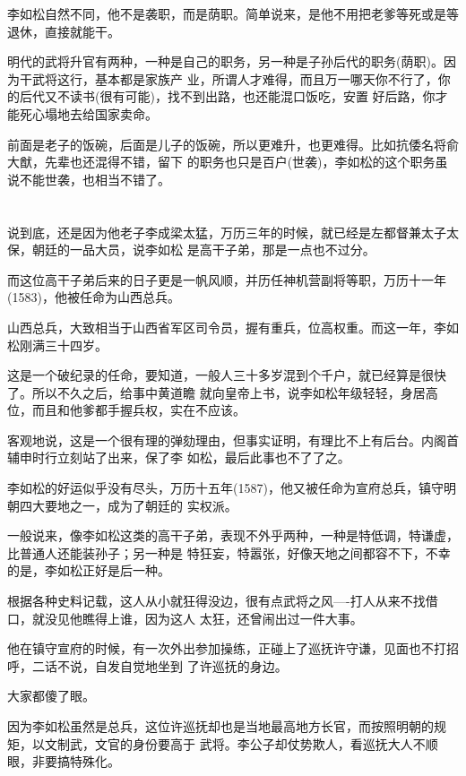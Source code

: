 \documentclass[11pt,a4paper,onecolumn]{article}
\begin{document}
李如松自然不同，他不是袭职，而是荫职。简单说来，是他不用把老爹等死或是等退休，直接就能干。

明代的武将升官有两种，一种是自己的职务，另一种是子孙后代的职务(荫职)。因为干武将这行，基本都是家族产
业，所谓人才难得，而且万一哪天你不行了，你的后代又不读书(很有可能)，找不到出路，也还能混口饭吃，安置
好后路，你才能死心塌地去给国家卖命。

前面是老子的饭碗，后面是儿子的饭碗，所以更难升，也更难得。比如抗倭名将俞大猷，先辈也还混得不错，留下
的职务也只是百户(世袭)，李如松的这个职务虽说不能世袭，也相当不错了。

\section[\thesection]{}

说到底，还是因为他老子李成梁太猛，万历三年的时候，就已经是左都督兼太子太保，朝廷的一品大员，说李如松
是高干子弟，那是一点也不过分。

而这位高干子弟后来的日子更是一帆风顺，并历任神机营副将等职，万历十一年(1583)，他被任命为山西总兵。

山西总兵，大致相当于山西省军区司令员，握有重兵，位高权重。而这一年，李如松刚满三十四岁。

这是一个破纪录的任命，要知道，一般人三十多岁混到个千户，就已经算是很快了。所以不久之后，给事中黄道瞻
就向皇帝上书，说李如松年级轻轻，身居高位，而且和他爹都手握兵权，实在不应该。

客观地说，这是一个很有理的弹劾理由，但事实证明，有理比不上有后台。内阁首辅申时行立刻站了出来，保了李
如松，最后此事也不了了之。

李如松的好运似乎没有尽头，万历十五年(1587)，他又被任命为宣府总兵，镇守明朝四大要地之一，成为了朝廷的
实权派。

一般说来，像李如松这类的高干子弟，表现不外乎两种，一种是特低调，特谦虚，比普通人还能装孙子；另一种是
特狂妄，特嚣张，好像天地之间都容不下，不幸的是，李如松正好是后一种。

根据各种史料记载，这人从小就狂得没边，很有点武将之风----打人从来不找借口，就没见他瞧得上谁，因为这人
太狂，还曾闹出过一件大事。

他在镇守宣府的时候，有一次外出参加操练，正碰上了巡抚许守谦，见面也不打招呼，二话不说，自发自觉地坐到
了许巡抚的身边。

大家都傻了眼。

因为李如松虽然是总兵，这位许巡抚却也是当地最高地方长官，而按照明朝的规矩，以文制武，文官的身份要高于
武将。李公子却仗势欺人，看巡抚大人不顺眼，非要搞特殊化。
\end{document}

